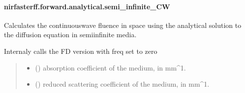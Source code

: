\documentclass[letterpaper,10pt,english]{sphinxmanual}
\begin{document}
\sphinxstepscope


\paragraph{nirfasterff.forward.analytical.semi\_infinite\_CW}
\label{\detokenize{_autosummary/nirfasterff.forward.analytical.semi_infinite_CW:nirfasterff-forward-analytical-semi-infinite-cw}}\label{\detokenize{_autosummary/nirfasterff.forward.analytical.semi_infinite_CW::doc}}

\begin{fulllineitems}
\label{\detokenize{_autosummary/nirfasterff.forward.analytical.semi_infinite_CW:nirfasterff.forward.analytical.semi_infinite_CW}}
\pysigstartsignatures
{}
\pysigstopsignatures
\sphinxAtStartPar
Calculates the continuous\sphinxhyphen{}wave fluence in space using the analytical solution to the diffusion equation in semi\sphinxhyphen{}infinite media.

\sphinxAtStartPar
Internaly calls the FD version with freq set to zero
\begin{quote}\begin{description}
\begin{itemize}
\item {} 
\sphinxAtStartPar
{} () \textendash{} absorption coefficient of the medium, in mm\textasciicircum{}\sphinxhyphen{}1.

\item {} 
\sphinxAtStartPar
{} () \textendash{} reduced scattering coefficient of the medium, in mm\textasciicircum{}\sphinxhyphen{}1.


\end{itemize}
\end{description}
\end{quote}
\end{fulllineitems}
\end{document}
